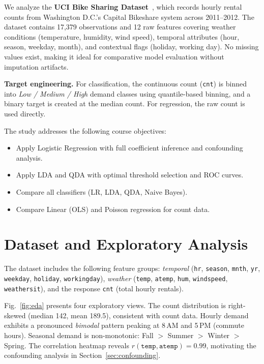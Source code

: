 \documentclass[conference]{IEEEtran}
\begin{document}
We analyze the \textbf{UCI Bike Sharing Dataset}~\cite{uci,fanaee}, which records hourly rental counts from Washington D.C.'s Capital Bikeshare system across 2011--2012.
The dataset contains 17,379 observations and 12 raw features covering weather conditions (temperature, humidity, wind speed), temporal attributes (hour, season, weekday, month), and contextual flags (holiday, working day).
No missing values exist, making it ideal for comparative model evaluation without imputation artifacts.

\textbf{Target engineering.}
For classification, the continuous count (\texttt{cnt}) is binned into \emph{Low / Medium / High} demand classes using quantile-based binning, and a binary target is created at the median count.
For regression, the raw count is used directly.

The study addresses the following course objectives:
\begin{itemize}
    \item Apply Logistic Regression with full coefficient inference and confounding analysis.
    \item Apply LDA and QDA with optimal threshold selection and ROC curves.
    \item Compare all classifiers (LR, LDA, QDA, Naive Bayes).
    \item Compare Linear (OLS) and Poisson regression for count data.
\end{itemize}

\section{Dataset and Exploratory Analysis}

The dataset includes the following feature groups:
\emph{temporal} (\texttt{hr}, \texttt{season}, \texttt{mnth}, \texttt{yr}, \texttt{weekday}, \texttt{holiday}, \texttt{workingday}),
\emph{weather} (\texttt{temp}, \texttt{atemp}, \texttt{hum}, \texttt{windspeed}, \texttt{weathersit}),
and the response \texttt{cnt} (total hourly rentals).

Fig.~\ref{fig:eda} presents four exploratory views.
The count distribution is right-skewed (median 142, mean 189.5), consistent with count data.
Hourly demand exhibits a pronounced \emph{bimodal} pattern peaking at 8\,AM and 5\,PM (commute hours).
Seasonal demand is non-monotonic: Fall $>$ Summer $>$ Winter $>$ Spring.
The correlation heatmap reveals $r(\texttt{temp}, \texttt{atemp}) = 0.99$, motivating the confounding analysis in Section~\ref{sec:confounding}.
\end{document}
